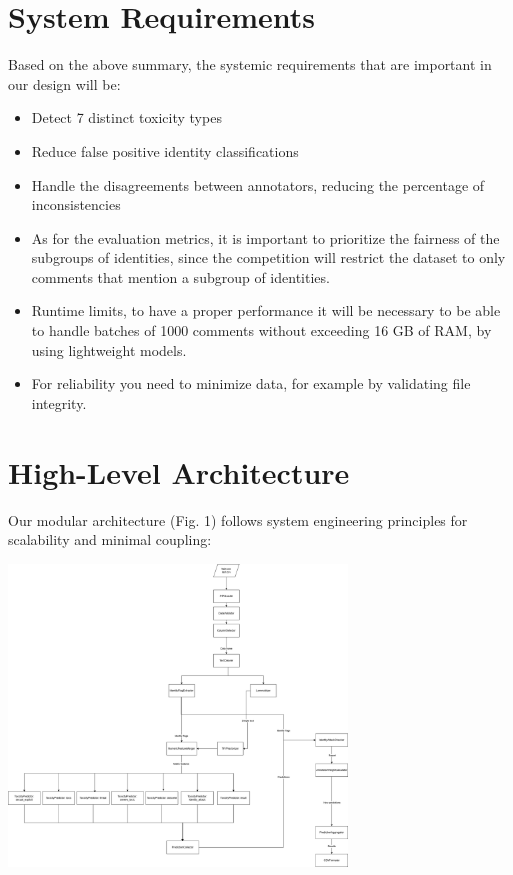 \documentclass[conference]{IEEEtran}
\begin{document}
\section{System Requirements}
Based on the above summary, the systemic requirements that are important in our design will be:
\begin{itemize}
\item Detect 7 distinct toxicity types
\item Reduce false positive identity classifications
\item Handle the disagreements between annotators, reducing the percentage of inconsistencies
\item As for the evaluation metrics, it is important to prioritize the fairness of the subgroups of identities, since the competition will restrict the dataset to only comments that mention a subgroup of identities.
\item Runtime limits, to have a proper performance it will be necessary to be able to handle batches of 1000 comments without exceeding 16 GB of RAM, by using lightweight models.
\item For reliability you need to minimize data, for example by validating file integrity.
\end{itemize}

\section{High-Level Architecture}
Our modular architecture (Fig. 1) follows system engineering principles for scalability and minimal coupling:

\includegraphics[width=9cm]{img/Systemblueprint.drawio (1).png}\\[0.5cm]
\end{document}

